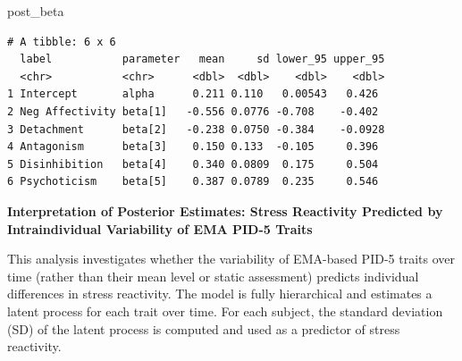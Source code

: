 \documentclass[
  11pt,
  a4paper,
  onecolumn]{article}
\newenvironment{Shaded}{}{}
\newcommand{\AttributeTok}[1]{\textcolor[rgb]{0.84,0.23,0.29}{#1}}
\newcommand{\FunctionTok}[1]{\textcolor[rgb]{0.44,0.26,0.76}{#1}}
\newcommand{\NormalTok}[1]{\textcolor[rgb]{0.14,0.16,0.18}{#1}}
\newcommand{\OtherTok}[1]{\textcolor[rgb]{0.44,0.26,0.76}{#1}}
\newcommand{\SpecialCharTok}[1]{\textcolor[rgb]{0.00,0.36,0.77}{#1}}
\newcommand{\StringTok}[1]{\textcolor[rgb]{0.01,0.18,0.38}{#1}}
\begin{document}
\begin{Shaded}
\end{Shaded}

\begin{Shaded}
\begin{Highlighting}[]
\NormalTok{post\_beta}
\end{Highlighting}
\end{Shaded}

\begin{verbatim}
# A tibble: 6 x 6
  label           parameter   mean     sd lower_95 upper_95
  <chr>           <chr>      <dbl>  <dbl>    <dbl>    <dbl>
1 Intercept       alpha      0.211 0.110   0.00543   0.426 
2 Neg Affectivity beta[1]   -0.556 0.0776 -0.708    -0.402 
3 Detachment      beta[2]   -0.238 0.0750 -0.384    -0.0928
4 Antagonism      beta[3]    0.150 0.133  -0.105     0.396 
5 Disinhibition   beta[4]    0.340 0.0809  0.175     0.504 
6 Psychoticism    beta[5]    0.387 0.0789  0.235     0.546 
\end{verbatim}

\textbf{Interpretation of Posterior Estimates: Stress Reactivity
Predicted by Intraindividual Variability of EMA PID-5 Traits}

This analysis investigates whether the variability of EMA-based PID-5
traits over time (rather than their mean level or static assessment)
predicts individual differences in stress reactivity. The model is fully
hierarchical and estimates a latent process for each trait over time.
For each subject, the standard deviation (SD) of the latent process is
computed and used as a predictor of stress reactivity.
\end{document}
